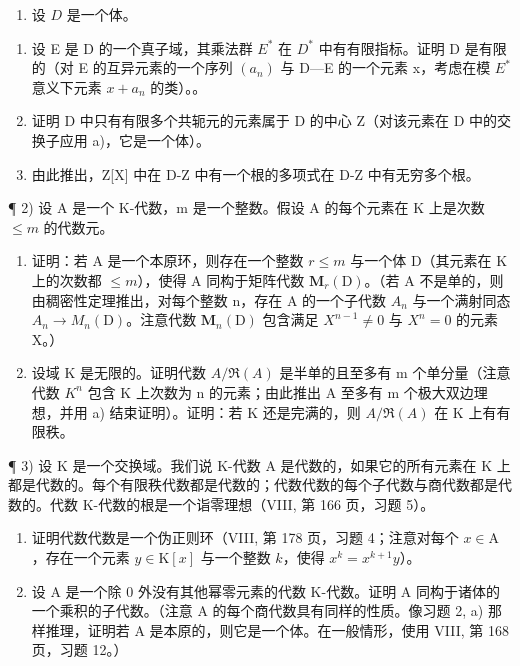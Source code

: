 
\begin{enumerate}
\def\labelenumi{\arabic{enumi})}
\tightlist
\item
  设 \(D\) 是一个体。
\end{enumerate}

\begin{enumerate}
\def\labelenumi{\alph{enumi})}
\item
  设 E 是 D 的一个真子域，其乘法群 \(E^{*}\) 在 \(D^{*}\) 中有有限指标。证明 D 是有限的（对 E 的互异元素的一个序列 \((a_{n})\) 与 D---E 的一个元素 x，考虑在模 \(E^{*}\) 意义下元素 \(x + a_{n}\) 的类）。。
\item
  证明 D 中只有有限多个共轭元的元素属于 D 的中心 Z（对该元素在 D 中的交换子应用 a)，它是一个体）。
\item
  由此推出，Z{[}X{]} 中在 D-Z 中有一个根的多项式在 D-Z 中有无穷多个根。
\end{enumerate}

¶ 2) 设 A 是一个 K-代数，m 是一个整数。假设 A 的每个元素在 K 上是次数 \(\leqslant m\) 的代数元。

\begin{enumerate}
\def\labelenumi{\alph{enumi})}
\item
  证明：若 A 是一个本原环，则存在一个整数 \(r \leqslant m\) 与一个体 D（其元素在 K 上的次数都 \(\leqslant m\)），使得 A 同构于矩阵代数 \(\mathbf{M}_{r}(\mathrm{D})\)。（若 A 不是单的，则由稠密性定理推出，对每个整数 n，存在 A 的一个子代数 \(A_{n}\) 与一个满射同态 \(A_{n} \to M_{n}(\mathrm{D})\)。注意代数 \(\mathbf{M}_{n}(\mathrm{D})\) 包含满足 \(X^{n-1} \neq 0\) 与 \(X^{n} = 0\) 的元素 X。）
\item
  设域 K 是无限的。证明代数 \(A/\Re(A)\) 是半单的且至多有 m 个单分量（注意代数 \(K^{n}\) 包含 K 上次数为 n 的元素；由此推出 A 至多有 m 个极大双边理想，并用 a) 结束证明）。证明：若 K 还是完满的，则 \(A/\Re(A)\) 在 K 上有有限秩。
\end{enumerate}

¶ 3) 设 K 是一个交换域。我们说 K-代数 A 是代数的，如果它的所有元素在 K 上都是代数的。每个有限秩代数都是代数的；代数代数的每个子代数与商代数都是代数的。代数 K-代数的根是一个诣零理想（VIII, 第 166 页，习题 5）。

\begin{enumerate}
\def\labelenumi{\alph{enumi})}
\item
  证明代数代数是一个伪正则环（VIII, 第 178 页，习题 4；注意对每个 \(x \in \mathrm{A}\)，存在一个元素 \(y \in \mathrm{K}[x]\) 与一个整数 \(k\)，使得 \(x^k = x^{k+1}y\)）。
\item
  设 A 是一个除 0 外没有其他幂零元素的代数 K-代数。证明 A 同构于诸体的一个乘积的子代数。（注意 A 的每个商代数具有同样的性质。像习题 2, a) 那样推理，证明若 A 是本原的，则它是一个体。在一般情形，使用 VIII, 第 168 页，习题 12。）
\end{enumerate}

